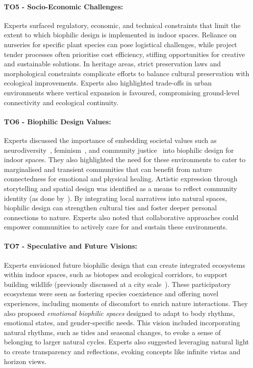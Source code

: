 \paragraph{TO5 - Socio-Economic Challenges:} Experts surfaced regulatory, economic, and technical constraints that limit the extent to which biophilic design is implemented in indoor spaces. Reliance on nurseries for specific plant species can pose logistical challenges, while project tender processes often prioritise cost efficiency, stifling opportunities for creative and sustainable solutions. In heritage areas, strict preservation laws and morphological constraints complicate efforts to balance cultural preservation with ecological improvements. Experts also highlighted trade-offs in urban environments where vertical expansion is favoured, compromising ground-level connectivity and ecological continuity.


\paragraph{TO6 - Biophilic Design Values:} Experts discussed the importance of embedding societal values such as neurodiversity~\cite{bruyere2022neurodiversity}, feminism~\cite{boys10there}, and community justice~\cite{fieuw2022towards} into biophilic design for indoor spaces. They also highlighted the need for these environments to cater to marginalised and transient communities that can benefit from nature connectedness for emotional and physical healing. Artistic expression through storytelling and spatial design was identified as a means to reflect community identity (as done by~\cite{samaha2023decolonizing}). By integrating local narratives into natural spaces, biophilic design can strengthen cultural ties and foster deeper personal connections to nature. Experts also noted that collaborative approaches could empower communities to actively care for and sustain these environments.


\paragraph{TO7 - Speculative and Future Visions:}
Experts envisioned future biophilic design that can create integrated ecosystems within indoor spaces, such as biotopes and ecological corridors, to support building wildlife (previously discussed at a city scale~\cite{zielinska2022rethinking}). These participatory ecosystems were seen as fostering species coexistence and offering novel experiences, including moments of discomfort to enrich nature interactions. They also proposed \emph{emotional biophilic spaces} designed to adapt to body rhythms, emotional states, and gender-specific needs. This vision included incorporating natural rhythms, such as tides and seasonal changes, to evoke a sense of belonging to larger natural cycles. Experts also suggested leveraging natural light to create transparency and reflections, evoking concepts like infinite vistas and horizon views.
